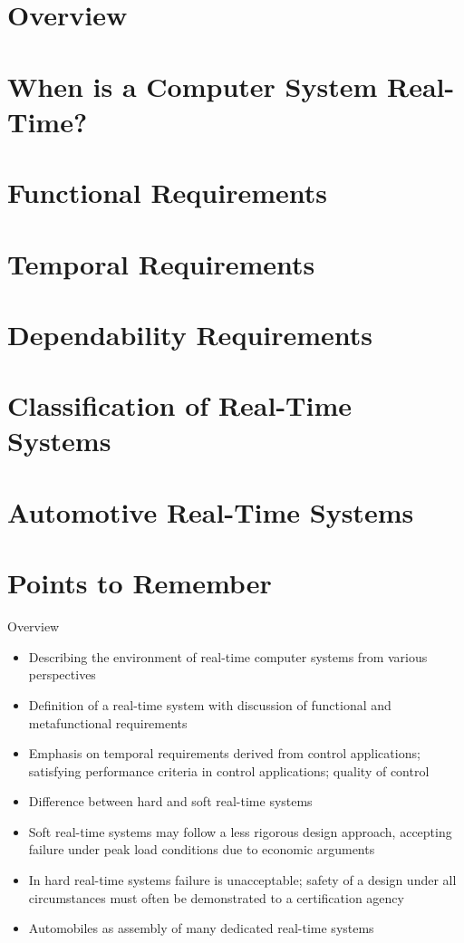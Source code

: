 %
%

\section{Overview}
\section{When is a Computer System Real-Time?}
\section{Functional Requirements}
\section{Temporal Requirements}
\section{Dependability Requirements}
\section{Classification of Real-Time Systems}
\section{Automotive Real-Time Systems}
\section{Points to Remember}

\begin{frame}{Overview}
\begin{itemize}
\item
  Describing the environment of real-time computer systems from various
  perspectives
\item
  Definition of a real-time system with discussion of functional and
  metafunctional requirements
\item
Emphasis on temporal requirements derived from control applications; satisfying performance criteria in control applications; quality of control
\item
Difference between hard and soft real-time systems
\item
Soft real-time systems may follow a less rigorous design approach, accepting failure under peak load conditions due to economic arguments
\item
In hard real-time systems failure is unacceptable; safety of a design under all circumstances must often be demonstrated to a certification agency
\item
  Automobiles as assembly of many dedicated real-time systems
\end{itemize}
\end{frame}


